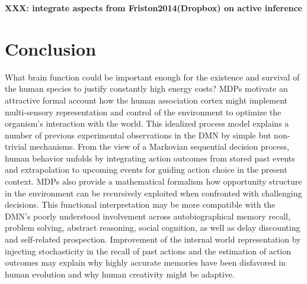 \documentclass[10pt,letterpaper]{article}
\def\W{\mathbf{W}}
\begin{document}

\textbf{XXX: integrate aspects from Friston2014(Dropbox) on active inference}

\section{Conclusion}
What brain function could be important enough
for the existence and survival of the human species
to justify constantly high energy costs?
MDPs motivate an attractive
formal account how the human association cortex
might implement multi-sensory representation and control of the environment to
optimize the organism's interaction with the world.
This idealized process model explains
a number of previous experimental observations in the
DMN by simple but non-trivial mechanisms.
%
From the view of a Markovian sequential decision process,
human behavior unfolds by integrating action outcomes from stored past events
and extrapolation to
upcoming events for guiding action choice in the present context.
MDPs also provide a mathematical formalism how
opportunity structure in the environment can be recursively exploited
when confronted with challenging decisions.
%
This functional interpretation may be more compatible with the DMN's
poorly understood involvement across
autobiographical memory recall, problem solving,
abstract reasoning, social cognition,
as well as delay discounting and self-related prospection.
Improvement of the internal world representation
by injecting stochasticity in the recall of past
actions and the estimation of action outcomes may explain why
highly accurate memories have been disfavored in human evolution
and why human creativity might be adaptive.
\end{document}
